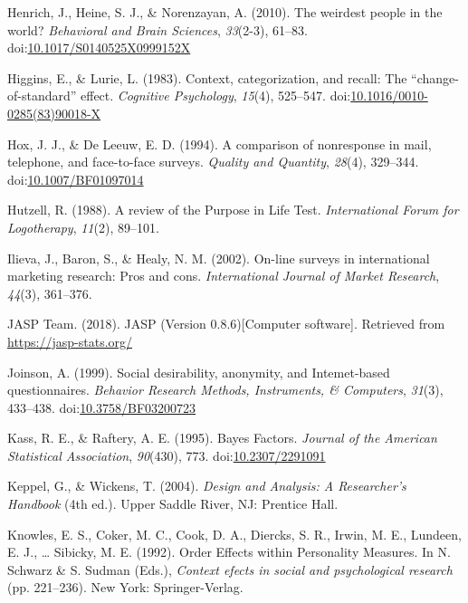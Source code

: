\documentclass[english,man, mask]{apa6}
\theoremstyle{definition}
\theoremstyle{definition}
\theoremstyle{definition}
\theoremstyle{remark}
\begin{document}
\hypertarget{ref-Henrich2010}{}
Henrich, J., Heine, S. J., \& Norenzayan, A. (2010). The weirdest people
in the world? \emph{Behavioral and Brain Sciences}, \emph{33}(2-3),
61--83.
doi:\href{https://doi.org/10.1017/S0140525X0999152X}{10.1017/S0140525X0999152X}

\hypertarget{ref-Higgins1983}{}
Higgins, E., \& Lurie, L. (1983). Context, categorization, and recall:
The ``change-of-standard'' effect. \emph{Cognitive Psychology},
\emph{15}(4), 525--547.
doi:\href{https://doi.org/10.1016/0010-0285(83)90018-X}{10.1016/0010-0285(83)90018-X}

\hypertarget{ref-Hox1994}{}
Hox, J. J., \& De Leeuw, E. D. (1994). A comparison of nonresponse in
mail, telephone, and face-to-face surveys. \emph{Quality and Quantity},
\emph{28}(4), 329--344.
doi:\href{https://doi.org/10.1007/BF01097014}{10.1007/BF01097014}

\hypertarget{ref-Hutzell1988}{}
Hutzell, R. (1988). A review of the Purpose in Life Test.
\emph{International Forum for Logotherapy}, \emph{11}(2), 89--101.

\hypertarget{ref-Ilieva2001}{}
Ilieva, J., Baron, S., \& Healy, N. M. (2002). On-line surveys in
international marketing research: Pros and cons. \emph{International
Journal of Market Research}, \emph{44}(3), 361--376.

\hypertarget{ref-JASP2018}{}
JASP Team. (2018). JASP (Version 0.8.6){[}Computer software{]}.
Retrieved from \url{https://jasp-stats.org/}

\hypertarget{ref-Joinson1999}{}
Joinson, A. (1999). Social desirability, anonymity, and Intemet-based
questionnaires. \emph{Behavior Research Methods, Instruments, \&
Computers}, \emph{31}(3), 433--438.
doi:\href{https://doi.org/10.3758/BF03200723}{10.3758/BF03200723}

\hypertarget{ref-Kass1995a}{}
Kass, R. E., \& Raftery, A. E. (1995). Bayes Factors. \emph{Journal of
the American Statistical Association}, \emph{90}(430), 773.
doi:\href{https://doi.org/10.2307/2291091}{10.2307/2291091}

\hypertarget{ref-Keppel2004}{}
Keppel, G., \& Wickens, T. (2004). \emph{Design and Analysis: A
Researcher's Handbook} (4th ed.). Upper Saddle River, NJ: Prentice Hall.

\hypertarget{ref-Knowles1992}{}
Knowles, E. S., Coker, M. C., Cook, D. A., Diercks, S. R., Irwin, M. E.,
Lundeen, E. J., \ldots{} Sibicky, M. E. (1992). Order Effects within
Personality Measures. In N. Schwarz \& S. Sudman (Eds.), \emph{Context
efects in social and psychological research} (pp. 221--236). New York:
Springer-Verlag.
\end{document}
